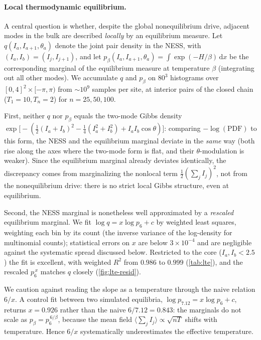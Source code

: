 \documentclass[11pt,a4paper]{article}
\theoremstyle{definition}
\numberwithin{equation}{section}   %
\begin{document}
\paragraph{Local thermodynamic equilibrium.}\label{par:lte}
A central question is whether, despite the global nonequilibrium drive,
adjacent modes in the bulk are described \emph{locally} by an equilibrium
measure. Let $q(I_a,I_{a+1},\theta_a)$ denote the joint pair density in the
NESS, with $(I_a,I_b)=(I_j,I_{j+1})$, and let
$p_\beta(I_a,I_{a+1},\theta_a)=\int \exp(-H/\beta)\,\mathrm dx$ be the
corresponding marginal of the equilibrium measure at temperature $\beta$
(integrating out all other modes). We accumulate $q$ and $p_\beta$ on
$80^3$ histograms over $[0,4]^2\times[-\pi,\pi)$ from $\sim10^9$ samples per
site, at interior pairs of the closed chain ($T_1=10,T_n=2$) for
$n=25,50,100$.

First, neither $q$ nor $p_\beta$ equals the two-mode Gibbs density
$\exp\!\big[-(\tfrac12(I_a{+}I_b)^2-\tfrac14(I_a^2{+}I_b^2)+I_aI_b\cos\theta)\big]$:
comparing $-\log(\text{PDF})$ to this form, the NESS and the equilibrium
marginal deviate in the \emph{same} way (both rise along the axes where the
two-mode form is flat, and their $\theta$-modulation is weaker). Since the
equilibrium marginal already deviates identically, the discrepancy comes from
marginalizing the nonlocal term $\tfrac12(\sum_j I_j)^2$, not from the
nonequilibrium drive: there is no strict local Gibbs structure, even at
equilibrium.

Second, the NESS marginal is nonetheless well approximated by a
\emph{rescaled} equilibrium marginal. We fit $\log q = x\log p_6 + c$ by
weighted least squares, weighting each bin by its count (the inverse variance
of the log-density for multinomial counts); statistical errors on $x$ are
below $3\times10^{-4}$ and are negligible against the systematic spread
discussed below. Restricted to the core ($I_a,I_b<2.5$) the fit is excellent,
with weighted $R^2$ from $0.986$ to $0.999$ (\cref{tab:lte}), and the rescaled
$p_6^{\,x}$ matches $q$ closely (\cref{fig:lte-resid}).

We caution against reading the slope as a temperature through the naive
relation $6/x$. A control fit between two simulated equilibria,
$\log p_{7.12}=x\log p_6+c$, returns $x=0.926$ rather than the naive
$6/7.12=0.843$: the marginals do not scale as $p_\beta=p_6^{\,6/\beta}$,
because the mean field $\langle\sum_j I_j\rangle\propto\sqrt{nT}$ shifts with
temperature. Hence $6/x$ systematically underestimates the effective
temperature.
\end{document}
